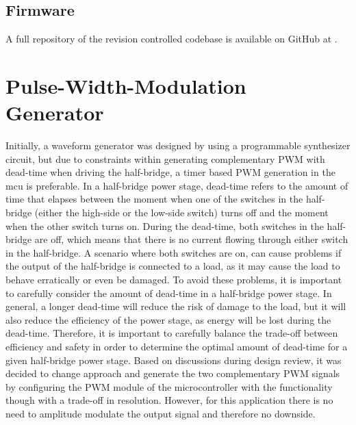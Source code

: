 \subsection{Firmware}
A full repository of the revision controlled codebase is available on GitHub at \cite{github_firmware}.

\section{Pulse-Width-Modulation Generator}
Initially, a waveform generator was designed by using a programmable synthesizer circuit, but due to constraints within generating complementary PWM with dead-time when driving the half-bridge, a timer based PWM generation in the \gls{mcu} is preferable. In a half-bridge power stage, dead-time refers to the amount of time that elapses between the moment when one of the switches in the half-bridge (either the high-side or the low-side switch) turns off and the moment when the other switch turns on. During the dead-time, both switches in the half-bridge are off, which means that there is no current flowing through either switch in the half-bridge. A scenario where both switches are on, can cause problems if the output of the half-bridge is connected to a load, as it may cause the load to behave erratically or even be damaged. To avoid these problems, it is important to carefully consider the amount of dead-time in a half-bridge power stage. In general, a longer dead-time will reduce the risk of damage to the load, but it will also reduce the efficiency of the power stage, as energy will be lost during the dead-time. Therefore, it is important to carefully balance the trade-off between efficiency and safety in order to determine the optimal amount of dead-time for a given half-bridge power stage. Based on discussions during design review, it was decided to change approach and generate the two complementary PWM signals by configuring the PWM module of the microcontroller with the functionality though with a trade-off in resolution. However, for this application there is no need to amplitude modulate the output signal and therefore no downside.


